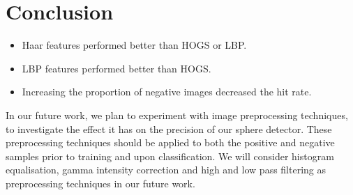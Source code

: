 \documentclass{llncs}
\begin{document}
	\section{Conclusion} {
	\label{sec:conclusion}

		\begin{itemize}
			\item Haar features performed better than HOGS or LBP.
			\item LBP features performed better than HOGS.
			\item Increasing the proportion of negative images decreased the hit rate.
		\end{itemize}

		In our future work, we plan to experiment with image preprocessing techniques, to investigate the effect it has on the precision of our sphere detector. These preprocessing techniques should be applied to both the positive and negative samples prior to training and upon classification. We will consider histogram equalisation, gamma intensity correction and high and low pass filtering \citep{gross2003image} as preprocessing techniques in our future work.

	}

	
	
\end{document}
